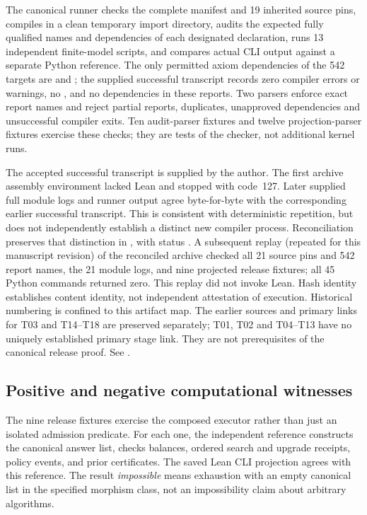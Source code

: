 The canonical runner checks the complete manifest and 19 inherited source pins, compiles in a clean temporary import directory, audits the expected fully qualified names and dependencies of each designated declaration, runs 13 independent finite-model scripts, and compares actual CLI output against a separate Python reference. The only permitted axiom dependencies of the 542 targets are  and ; the supplied successful transcript records zero compiler errors or warnings, no , and no  dependencies in these reports. Two parsers enforce exact report names and reject partial reports, duplicates, unapproved dependencies and unsuccessful compiler exits. Ten audit-parser fixtures and twelve projection-parser fixtures exercise these checks; they are tests of the checker, not additional kernel runs.

The accepted successful transcript is supplied by the author. The first archive assembly environment lacked Lean and stopped with code~127. Later supplied full module logs and runner output agree byte-for-byte with the corresponding earlier successful transcript. This is consistent with deterministic repetition, but does not independently establish a distinct new compiler process. Reconciliation preserves that distinction in , with status . A subsequent replay (repeated for this manuscript revision) of the reconciled archive checked all 21 source pins and 542 report names, the 21 module logs, and nine projected release fixtures; all 45 Python commands returned zero. This replay did not invoke Lean. Hash identity establishes content identity, not independent attestation of execution. Historical numbering is confined to this artifact map. The earlier sources and primary links for T03 and T14--T18 are preserved separately; T01, T02 and T04--T13 have no uniquely established primary stage link. They are not prerequisites of the canonical release proof. See .

\clearpage
\subsection{Positive and negative computational witnesses}
The nine release fixtures exercise the composed executor rather than just an isolated admission predicate. For each one, the independent reference constructs the canonical answer list, checks balances, ordered search and upgrade receipts, policy events, and prior certificates. The saved Lean CLI projection agrees with this reference. The result \emph{impossible} means exhaustion with an empty canonical list in the specified morphism class, not an impossibility claim about arbitrary algorithms.

